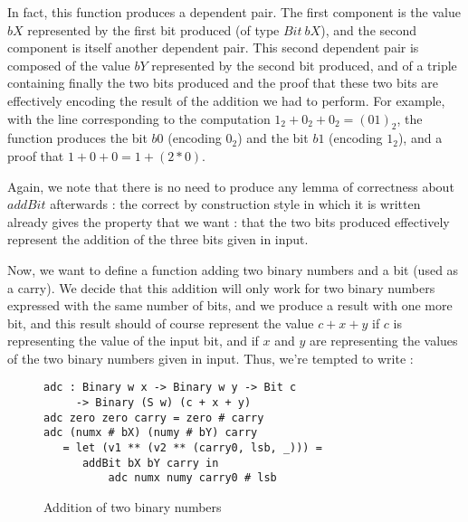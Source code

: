 In fact, this function produces a dependent pair. The first component is the value $bX$ represented by the first bit produced (of type $Bit\ bX$), and the second component is itself another dependent pair. This second dependent pair is composed of the value $bY$ represented by the second bit produced, and of a triple containing finally the two bits produced and the proof that these two bits are effectively encoding the result of the addition we had to perform.
For example, with the line corresponding to the computation $1_2 + 0_2 + 0_2 = (01)_2$, the function produces the bit $b0$ (encoding $0_2$) and the bit $b1$ (encoding $1_2$), and a proof that $1 + 0 + 0 = 1 + (2*0)$.

Again, we note that there is no need to produce any lemma of correctness about $addBit$ afterwards : the correct by construction style in which it is written already gives the property that we want : that the two bits produced effectively represent the addition of the three bits given in input.

Now, we want to define a function adding two binary numbers and a bit (used as a carry). We decide that this addition will only work for two binary numbers expressed with the same number of bits, and we produce a result with one more bit, and this result should of course represent the value $c + x + y$ if $c$ is representing the value of the input bit, and if $x$ and $y$ are representing the values of the two binary numbers given in input. Thus, we're tempted to write :
\begin{figure}[H]
\figrule
\begin{center}
\begin{verbatim}
adc : Binary w x -> Binary w y -> Bit c 
     -> Binary (S w) (c + x + y)
adc zero zero carry = zero # carry
adc (numx # bX) (numy # bY) carry
   = let (v1 ** (v2 ** (carry0, lsb, _))) = 
      addBit bX bY carry in
          adc numx numy carry0 # lsb
\end{verbatim}
\end{center}
\caption{Addition of two binary numbers}
\figrule
\end{figure}

